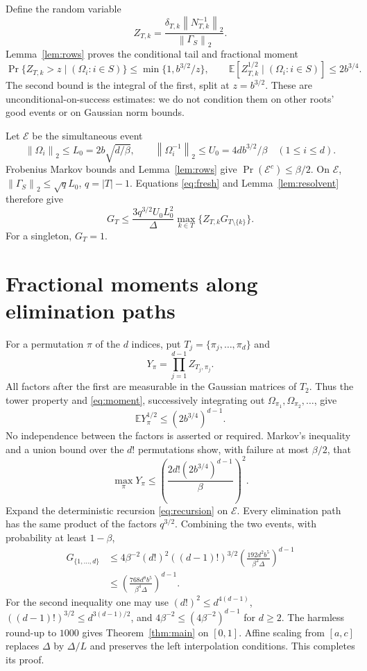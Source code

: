 \documentclass[11pt]{article}
\newcommand{\norm}[1]{\left\lVert#1\right\rVert}
\begin{document}
Define the random variable
\[
 Z_{T,k}=\frac{\delta_{T,k}\norm{N_{T,k}^{-1}}_2}
                      {\norm{\Gamma_S}_2}.
\]
Lemma~\ref{lem:rows} proves the conditional tail and fractional moment
\begin{equation}\label{eq:moment}
 \Pr\{Z_{T,k}>z\mid(\Omega_i:i\in S)\}
       \leq\min\{1,b^{3/2}/z\},\qquad
 \mathbb E[Z_{T,k}^{1/2}\mid(\Omega_i:i\in S)]\leq2b^{3/4}.
\end{equation}
The second bound is the integral of the first, split at $z=b^{3/2}$.
These are unconditional-on-success estimates: we do not condition them
on other roots' good events or on Gaussian norm bounds.

Let $\mathcal E$ be the simultaneous event
\[
 \norm{\Omega_i}_2\leq L_0=2b\sqrt{d/\beta},\qquad
 \norm{\Omega_i^{-1}}_2\leq U_0=4db^{3/2}/\beta
             \quad(1\leq i\leq d).
\]
Frobenius Markov bounds and Lemma~\ref{lem:rows} give
$\Pr(\mathcal E^c)\leq\beta/2$.
On $\mathcal E$, $\norm{\Gamma_S}_2\leq\sqrt qL_0$, $q=|T|-1$.
Equations \eqref{eq:fresh} and Lemma~\ref{lem:resolvent} therefore give
\begin{equation}\label{eq:recursion}
 G_T\leq\frac{3q^{3/2}U_0L_0^2}{\Delta}
                    \max_{k\in T}\{Z_{T,k}G_{T\setminus\{k\}}\}.
\end{equation}
For a singleton, $G_T=1$.

\section{Fractional moments along elimination paths}
For a permutation $\pi$ of the $d$ indices, put
$T_j=\{\pi_j,\ldots,\pi_d\}$ and
\[
 Y_\pi=\prod_{j=1}^{d-1}Z_{T_j,\pi_j}.
\]
All factors after the first are measurable in the Gaussian matrices of
$T_2$. Thus the tower property and \eqref{eq:moment}, successively
integrating out $\Omega_{\pi_1},\Omega_{\pi_2},\ldots$, give
\[
 \mathbb E Y_\pi^{1/2}\leq(2b^{3/4})^{d-1}.
\]
No independence between the factors is asserted or required. Markov's
inequality and a union bound over the $d!$ permutations show, with failure
at most $\beta/2$, that
\[
 \max_\pi Y_\pi\leq
 \left(\frac{2d!(2b^{3/4})^{d-1}}\beta\right)^2.
\]
Expand the deterministic recursion \eqref{eq:recursion} on $\mathcal E$.
Every elimination path has the same product of the factors $q^{3/2}$.
Combining the two events, with probability at least $1-\beta$,
\begin{align*}
 G_{\{1,\ldots,d\}}
 &\leq4\beta^{-2}(d!)^2((d-1)!)^{3/2}
       \left(\frac{192d^2b^5}{\beta^2\Delta}\right)^{d-1}\\
 &\leq\left(\frac{768d^8b^5}{\beta^4\Delta}\right)^{d-1}.
\end{align*}
For the second inequality one may use
$(d!)^2\leq d^{4(d-1)}$, $((d-1)!)^{3/2}\leq d^{3(d-1)/2}$,
and $4\beta^{-2}\leq(4\beta^{-2})^{d-1}$ for $d\geq2$.
The harmless round-up to $1000$ gives Theorem~\ref{thm:main} on $[0,1]$.
Affine scaling from $[a,c]$ replaces $\Delta$ by $\Delta/L$ and preserves
the left interpolation conditions. This completes its proof.
\end{document}
